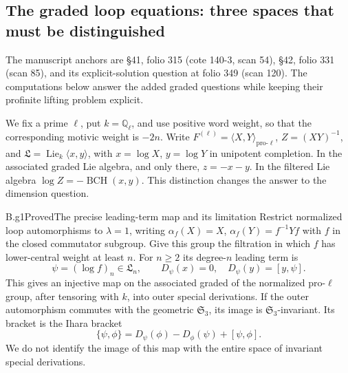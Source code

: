 \subsection{The graded loop equations: three spaces that must be distinguished}

The manuscript anchors are \S41, folio 315 (cote 140-3, scan 54),
\S42, folio 331 (scan 85), and its explicit-solution question at
folio 349 (scan 120).  The computations below answer the added graded
questions while keeping their profinite lifting problem explicit.

We fix a prime $\ell$, put $k=\mathbb Q_\ell$, and use positive word weight,
so that the corresponding motivic weight is $-2n$.  Write
$F^{(\ell)}=\langle X,Y\rangle_{\mathrm{pro}\text{-}\ell}$,
$Z=(XY)^{-1}$, and $\mathfrak L=\operatorname{Lie}_k\langle x,y\rangle$,
with $x=\log X$, $y=\log Y$ in unipotent completion.  In the associated
graded Lie algebra, and only there, $z=-x-y$.  In the filtered Lie algebra
$\log Z=-\operatorname{BCH}(x,y)$.
This distinction changes the answer to the dimension question.

\begin{claim}{B.g1}{Proved}{The precise leading-term map and its limitation}
Restrict normalized loop automorphisms to $\lambda=1$, writing
$\alpha_f(X)=X$, $\alpha_f(Y)=f^{-1}Yf$ with $f$ in the closed commutator
subgroup.  Give this group the filtration in which $f$ has lower-central
weight at least $n$.  For $n\geq2$ its degree-$n$ leading term is
\[
 \psi=(\log f)_n\in\mathfrak L_n,\qquad
 D_\psi(x)=0,\quad D_\psi(y)=[y,\psi].
\]
This gives an injective map on the associated graded of the normalized
pro-$\ell$ group, after tensoring with $k$, into outer special derivations.
If the outer automorphism commutes with the geometric $\mathfrak S_3$,
its image is $\mathfrak S_3$-invariant.  Its bracket is the Ihara bracket
\[
 \{\psi,\phi\}=D_\psi(\phi)-D_\phi(\psi)+[\psi,\phi].
\]
We do not identify the image of this map with the entire space of
invariant special derivations.
\end{claim}

